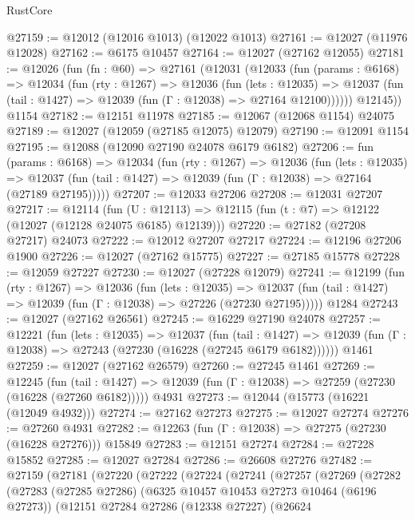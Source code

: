 \begin{lexlean}{RustCore}
\begin{coremodule}
@27159 := @12012 (@12016 @1013) (@12022 @1013)
@27161 := @12027 (@11976 @12028)
@27162 := @6175 @10457
@27164 := @12027 (@27162 @12055)
@27181 := @12026
    (fun (fn : @60) =>
    @27161
      (@12031
        (@12033
          (fun (params : @6168) =>
          @12034
            (fun (rty : @1267) =>
            @12036
              (fun (lets : @12035) =>
              @12037 (fun (tail : @1427) => @12039 (fun (Γ : @12038) => @27164 @12100))))))
        @12145))
    @1154
@27182 := @12151 @11978
@27185 := @12067 (@12068 @1154) @24075
@27189 := @12027 (@12059 (@27185 @12075) @12079)
@27190 := @12091 @1154
@27195 := @12088 (@12090 @27190 @24078 @6179 @6182)
@27206 := fun (params : @6168) =>
  @12034
    (fun (rty : @1267) =>
    @12036
      (fun (lets : @12035) =>
      @12037 (fun (tail : @1427) => @12039 (fun (Γ : @12038) => @27164 (@27189 @27195)))))
@27207 := @12033 @27206
@27208 := @12031 @27207
@27217 := @12114
    (fun (U : @12113) => @12115 (fun (t : @7) => @12122 (@12027 (@12128 @24075 @6185) @12139)))
@27220 := @27182 (@27208 @27217) @24073
@27222 := @12012 @27207 @27217
@27224 := @12196 @27206 @1900
@27226 := @12027 (@27162 @15775)
@27227 := @27185 @15778
@27228 := @12059 @27227
@27230 := @12027 (@27228 @12079)
@27241 := @12199
    (fun (rty : @1267) =>
    @12036
      (fun (lets : @12035) =>
      @12037 (fun (tail : @1427) => @12039 (fun (Γ : @12038) => @27226 (@27230 @27195)))))
    @1284
@27243 := @12027 (@27162 @26561)
@27245 := @16229 @27190 @24078
@27257 := @12221
    (fun (lets : @12035) =>
    @12037
      (fun (tail : @1427) =>
      @12039 (fun (Γ : @12038) => @27243 (@27230 (@16228 (@27245 @6179 @6182))))))
    @1461
@27259 := @12027 (@27162 @26579)
@27260 := @27245 @1461
@27269 := @12245
    (fun (tail : @1427) => @12039 (fun (Γ : @12038) => @27259 (@27230 (@16228 (@27260 @6182)))))
    @4931
@27273 := @12044 (@15773 (@16221 (@12049 @4932)))
@27274 := @27162 @27273
@27275 := @12027 @27274
@27276 := @27260 @4931
@27282 := @12263 (fun (Γ : @12038) => @27275 (@27230 (@16228 @27276))) @15849
@27283 := @12151 @27274
@27284 := @27228 @15852
@27285 := @12027 @27284
@27286 := @26608 @27276
@27482 := @27159
    (@27181
      (@27220
        (@27222
          (@27224
            (@27241
              (@27257
                (@27269
                  (@27282
                    (@27283
                      (@27285 @27286)
                      (@6325 @10457 @10453 @27273 @10464 (@6196 @27273))
                      (@12151
                        @27284
                        @27286
                        (@12338 @27227)
                        (@26624

\end{coremodule}
\end{lexlean}
